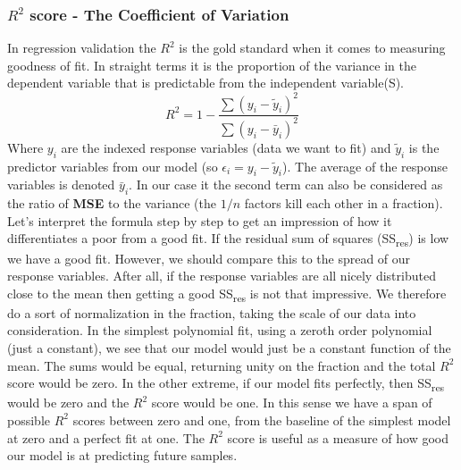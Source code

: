 \subsubsection{$R^2$ score - The Coefficient of Variation}
In regression validation the $R^2$ is the gold standard when it comes to measuring goodness of fit. In straight terms it is the proportion of the variance in the dependent variable that is predictable from the independent variable(S).\cite{coef}
\begin{equation}\label{eq: R squared}
	R^2 = 1 - \frac{ \sum(y_i-\tilde{y}_i)^2 }{ \sum(y_i-\bar{y}_i)^2 }
\end{equation}
Where $y_i$ are the indexed response variables (data we want to fit) and $\tilde{y}_i$ is the predictor variables from our model (so $\epsilon_i = y_i - \tilde{y}_i$). The average of the response variables is denoted $\bar{y}_i$. In our case it the second term can also be considered as the ratio of \textbf{MSE} to the variance (the $1/n$ factors kill each other in a fraction). Let's interpret the formula step by step to get an impression of how it differentiates a poor from a good fit. If the residual sum of squares (SS\textsubscript{res}) is low we have a good fit. However, we should compare this to the spread of our response variables. After all, if the response variables are all nicely distributed close to the mean then getting a good SS\textsubscript{res} is not that impressive. We therefore do a sort of normalization in the fraction, taking the scale of our data into consideration. In the simplest polynomial fit, using a zeroth order polynomial (just a constant), we see that our model would just be a constant function of the mean. The sums would be equal, returning unity on the fraction and the total $R^2$ score would be zero. In the other extreme, if our model fits perfectly, then SS\textsubscript{res} would be zero and the $R^2$ score would be one. In this sense we have a span of possible $R^2$ scores between zero and one, from the baseline of the simplest model at zero and a perfect fit at one. The $R^2$ score is useful as a measure of how good our model is at predicting future samples.

